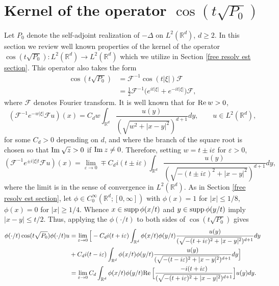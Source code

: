 \documentclass[11pt]{amsart}
\numberwithin{equation}{section}
\def\R{{\mathbb R}}
\def\Re{{\rm Re}\:}
\def\Im{{\rm Im}\:}
\begin{document}
\section{Kernel of the operator $\cos(t \sqrt{P_0})$} \label{cosine kernel appendix}


Let $P_0$ denote the self-adjoint realization of $-\Delta$ on $L^2(\R^d)$, $d \ge 2$. In this section we review well known properties of the kernel of the operator $\cos(t \sqrt{P_0}) : L^2(\R^d) \to L^2(\R^d)$ which we utilize in Section \ref{free resolv est section}. This operator also takes the form 
\begin{equation*}
\begin{split}
\cos(t \sqrt{P_0}) &=  \mathcal{F}^{-1} \cos(t |\xi|) \mathcal{F} \\
&= \tfrac{1}{2} \mathcal{F}^{-1} \big( e^{it|\xi|} + e^{-it|\xi|}\big) \mathcal{F},
\end{split}
\end{equation*}
where $\mathcal{F}$ denotes Fourier transform. It is well known \cite[Chapter III, Section 2]{kn:S70} that for $\Re w > 0$, 
\begin{equation*}
(\mathcal{F}^{-1} e^{-w |\xi | } \mathcal{F} u)(x) = C_d w \int_{\R^d} \frac{u(y)}{(\sqrt{w^2 + |x - y|^2})^{d+1}} dy,  \qquad u \in L^2(\R^d),
\end{equation*} 
for some $C_d  > 0$ depending on $d$, and where the branch of the square root is chosen so that $\Im \sqrt{z} > 0$ if $\Im z \neq 0$.  Therefore, setting $w = t \pm i \varepsilon$ for $\varepsilon > 0$,
\begin{equation} \label{compute kernel}
(\mathcal{F}^{-1} e^{ \pm i |\xi |t} \mathcal{F} u)(x) = \lim_{\varepsilon \to 0} \mp C_d i (t \pm i \varepsilon) \int_{\R^d} \frac{u(y)}{(\sqrt{-(t \pm i \varepsilon)^2 + |x - y|^2})^{d+1}} dy,
\end{equation}
where the limit is in the sense of convergence in $L^2(\R^d)$. As in Section \ref{free resolv est section}, let $\phi \in C^\infty_0(\R^d ; [0, \infty])$ with $\phi(x) = 1$ for $|x| \le 1/8$, $\phi(x) = 0$ for $|x| \ge 1/4$. Whence $x\in {\rm supp}\,\phi(x/t)$ and
$y\in {\rm supp}\,\phi(y/t)$ imply $|x-y|\le t/2$. Thus, applying the $\phi(\cdot/t)$ to both sides of $\cos(t \sqrt{P_0})$ gives
\begin{equation*}
\begin{split}
\phi(\cdot /t) \cos(t \sqrt{P_0}) \phi(\cdot/ t) u &= \lim_{\varepsilon \to 0} \Big[ -C_d i(t + i \varepsilon) \int_{\R^d} \phi(x/t) \phi(y/t)\frac{u(y)}{(\sqrt{-(t + i \varepsilon)^2 + |x - y|^2})^{d+1}} dy \\
&+  C_d i(t - i \varepsilon) \int_{\R^d} \phi(x/t) \phi(y/t)\frac{u(y)}{(\sqrt{-(t - i \varepsilon)^2 + |x - y|^2})^{d+1}} dy \Big] \\
&= \lim_{\varepsilon \to 0} C_d \int_{\R^d}  \phi(x/t) \phi(y/t) \Re \Big[ \frac{-i(t + i\varepsilon)}{(\sqrt{-(t + i \varepsilon)^2 + |x - y|^2})^{d+1}} \Big] u(y) dy.
\end{split}
\end{equation*}
\end{document}
